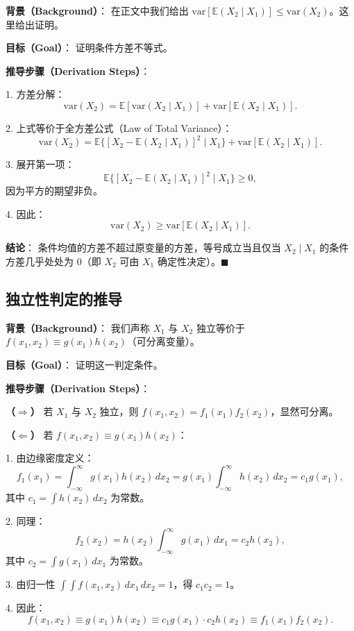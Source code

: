 \textbf{背景（Background）}：
在正文中我们给出 $\text{var}[\mathbb{E}(X_2 \mid X_1)] \leq \text{var}(X_2)$。这里给出证明。

\textbf{目标（Goal）}：
证明条件方差不等式。

\textbf{推导步骤（Derivation Steps）}：

1. 方差分解：
\[
\text{var}(X_2) = \mathbb{E}[\text{var}(X_2 \mid X_1)] + \text{var}[\mathbb{E}(X_2 \mid X_1)].
\]

2. 上式等价于全方差公式（Law of Total Variance）：
\[
\text{var}(X_2) = \mathbb{E}\{[X_2 - \mathbb{E}(X_2 \mid X_1)]^2 \mid X_1\} + \text{var}[\mathbb{E}(X_2 \mid X_1)].
\]

3. 展开第一项：
\[
\mathbb{E}\{[X_2 - \mathbb{E}(X_2 \mid X_1)]^2 \mid X_1\} \geq 0,
\]
因为平方的期望非负。

4. 因此：
\[
\text{var}(X_2) \geq \text{var}[\mathbb{E}(X_2 \mid X_1)].
\]

\textbf{结论}：
条件均值的方差不超过原变量的方差，等号成立当且仅当 $X_2 \mid X_1$ 的条件方差几乎处处为 0（即 $X_2$ 可由 $X_1$ 确定性决定）。$\blacksquare$

\subsection{独立性判定的推导}\label{sec:derivation-independence}

\textbf{背景（Background）}：
我们声称 $X_1$ 与 $X_2$ 独立等价于 $f(x_1, x_2) \equiv g(x_1) h(x_2)$（可分离变量）。

\textbf{目标（Goal）}：
证明这一判定条件。

\textbf{推导步骤（Derivation Steps）}：

\textbf{（$\Rightarrow$）} 若 $X_1$ 与 $X_2$ 独立，则 $f(x_1, x_2) = f_1(x_1) f_2(x_2)$，显然可分离。

\textbf{（$\Leftarrow$）} 若 $f(x_1, x_2) \equiv g(x_1) h(x_2)$：

1. 由边缘密度定义：
\[
f_1(x_1) = \int_{-\infty}^{\infty} g(x_1) h(x_2) \, dx_2 = g(x_1) \int_{-\infty}^{\infty} h(x_2) \, dx_2 = c_1 g(x_1),
\]
其中 $c_1 = \int h(x_2) \, dx_2$ 为常数。

2. 同理：
\[
f_2(x_2) = h(x_2) \int_{-\infty}^{\infty} g(x_1) \, dx_1 = c_2 h(x_2),
\]
其中 $c_2 = \int g(x_1) \, dx_1$ 为常数。

3. 由归一性 $\int\int f(x_1, x_2) \, dx_1 \, dx_2 = 1$，得 $c_1 c_2 = 1$。

4. 因此：
\[
f(x_1, x_2) \equiv g(x_1) h(x_2) \equiv c_1 g(x_1) \cdot c_2 h(x_2) \equiv f_1(x_1) f_2(x_2).
\]

